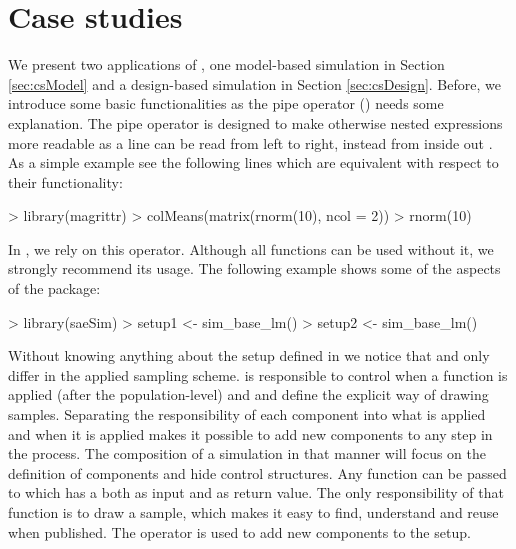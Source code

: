 \documentclass[article]{ajs}
\newcommand{\red}[1]{\color{red} #1 \color{black} }
\begin{document}
\section{Case studies}
\label{sec:caseStudy}
We present two applications of , one model-based simulation in Section \ref{sec:csModel} and a design-based simulation in Section \ref{sec:csDesign}. Before, we introduce some basic functionalities as the pipe operator (\proglang{\%>\%}) needs some explanation. The pipe operator is designed to make otherwise nested expressions more readable as a line can be read from left to right, instead from inside out \citep{bache14}. \red{As a simple example see the following lines which are equivalent with respect to their functionality:}

\begin{Schunk}
\begin{Sinput}
> library(magrittr)
> colMeans(matrix(rnorm(10), ncol = 2))
> rnorm(10) %
\end{Sinput}
\end{Schunk}

In , we rely on this operator. Although all functions can be used without it, we strongly recommend its usage. The following example shows some of the aspects of the package:


\begin{Schunk}
\begin{Sinput}
> library(saeSim)
> setup1 <- sim_base_lm() %
> setup2 <- sim_base_lm() %
\end{Sinput}
\end{Schunk}

Without knowing anything about the setup defined in  we notice that  and  only differ in the applied sampling scheme.  is responsible to control when a function is applied (after the population-level) and  and  define the explicit way of drawing samples. Separating the responsibility of each component into what is applied and when it is applied makes it possible to add new components to any step in the process. The composition of a simulation in that manner will focus on the definition of components and hide control structures. Any function can be passed to  which has a  both as input and as return value. The only responsibility of that function is to draw a sample, which makes it easy to find, understand and reuse when published. The operator \proglang{\%>\%} is used to add new components to the setup. 
\end{document}
